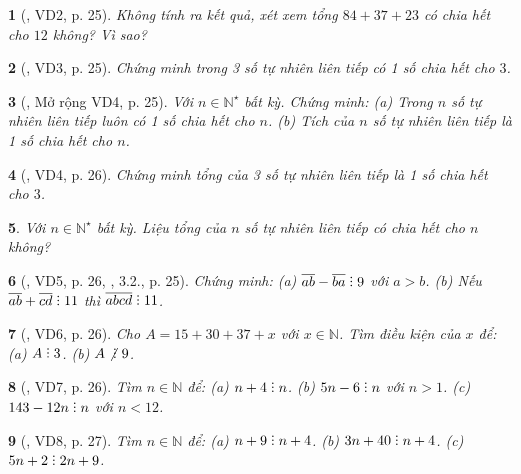 \documentclass{article}
\newtheorem{baitoan}{}
\DeclareRobustCommand{\divby}{%
	\mathrel{\vbox{\baselineskip.65ex\lineskiplimit0pt\hbox{.}\hbox{.}\hbox{.}}}%
}
\begin{document}
\begin{baitoan}[\cite{Binh_boi_duong_Toan_6_tap_1}, VD2, p. 25]
	Không tính ra kết quả, xét xem tổng $84 + 37 + 23$ có chia hết cho $12$ không? Vì sao?
\end{baitoan}

\begin{baitoan}[\cite{Binh_boi_duong_Toan_6_tap_1}, VD3, p. 25]
	Chứng minh trong 3 số tự nhiên liên tiếp có 1 số chia hết cho $3$.
\end{baitoan}

\begin{baitoan}[\cite{Binh_boi_duong_Toan_6_tap_1}, Mở rộng VD4, p. 25]
	Với $n\in\mathbb{N}^\star$ bất kỳ. Chứng minh: (a) Trong $n$ số tự nhiên liên tiếp luôn có 1 số chia hết cho $n$. (b) Tích của $n$ số tự nhiên liên tiếp là 1 số chia hết cho $n$.
\end{baitoan}

\begin{baitoan}[\cite{Binh_boi_duong_Toan_6_tap_1}, VD4, p. 26]
	Chứng minh tổng của 3 số tự nhiên liên tiếp là 1 số chia hết cho $3$.
\end{baitoan}

\begin{baitoan}
	Với $n\in\mathbb{N}^\star$ bất kỳ. Liệu tổng của $n$ số tự nhiên liên tiếp có chia hết cho $n$ không?
\end{baitoan}

\begin{baitoan}[\cite{Binh_boi_duong_Toan_6_tap_1}, VD5, p. 26, \cite{TLCT_THCS_Toan_6_so_hoc}, 3.2., p. 25]
	Chứng minh: (a) $\overline{ab} - \overline{ba}\divby9$ với $a > b$. (b) Nếu $\overline{ab} + \overline{cd}\divby11$ thì $\overline{abcd}\divby11$.
\end{baitoan}

\begin{baitoan}[\cite{Binh_boi_duong_Toan_6_tap_1}, VD6, p. 26]
	Cho $A = 15 + 30 + 37 + x$ với $x\in\mathbb{N}$. Tìm điều kiện của $x$ để: (a) $A\divby3$. (b) $A\not{\divby}\ 9$.
\end{baitoan}

\begin{baitoan}[\cite{Binh_boi_duong_Toan_6_tap_1}, VD7, p. 26]
	Tìm $n\in\mathbb{N}$ để: (a) $n + 4\divby n$. (b) $5n - 6\divby n$ với $n > 1$. (c) $143 - 12n\divby n$ với $n < 12$.
\end{baitoan}

\begin{baitoan}[\cite{Binh_boi_duong_Toan_6_tap_1}, VD8, p. 27]
	Tìm $n\in\mathbb{N}$ để: (a) $n + 9\divby n + 4$. (b) $3n + 40\divby n + 4$. (c) $5n + 2\divby2n + 9$.
\end{baitoan}
\end{document}
